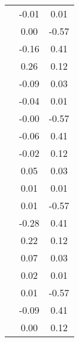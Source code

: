 \begin{table}
\begin{tabular}{c|cc|}
\multicolumn{1}{|c|}{} & \multicolumn{1}{|c|}{     -0.01} & \multicolumn{1}{|c|}{      0.01} \\ 
\multicolumn{1}{|c|}{} & \multicolumn{1}{|c|}{      0.00} & \multicolumn{1}{|c|}{     -0.57} \\ 
\multicolumn{1}{|c|}{} & \multicolumn{1}{|c|}{     -0.16} & \multicolumn{1}{|c|}{      0.41} \\ 
\multicolumn{1}{|c|}{} & \multicolumn{1}{|c|}{      0.26} & \multicolumn{1}{|c|}{      0.12} \\ 
\multicolumn{1}{|c|}{} & \multicolumn{1}{|c|}{     -0.09} & \multicolumn{1}{|c|}{      0.03} \\ 
\multicolumn{1}{|c|}{} & \multicolumn{1}{|c|}{     -0.04} & \multicolumn{1}{|c|}{      0.01} \\ 
\multicolumn{1}{|c|}{} & \multicolumn{1}{|c|}{     -0.00} & \multicolumn{1}{|c|}{     -0.57} \\ 
\multicolumn{1}{|c|}{} & \multicolumn{1}{|c|}{     -0.06} & \multicolumn{1}{|c|}{      0.41} \\ 
\multicolumn{1}{|c|}{} & \multicolumn{1}{|c|}{     -0.02} & \multicolumn{1}{|c|}{      0.12} \\ 
\multicolumn{1}{|c|}{} & \multicolumn{1}{|c|}{      0.05} & \multicolumn{1}{|c|}{      0.03} \\ 
\multicolumn{1}{|c|}{} & \multicolumn{1}{|c|}{      0.01} & \multicolumn{1}{|c|}{      0.01} \\ 
\multicolumn{1}{|c|}{} & \multicolumn{1}{|c|}{      0.01} & \multicolumn{1}{|c|}{     -0.57} \\ 
\multicolumn{1}{|c|}{} & \multicolumn{1}{|c|}{     -0.28} & \multicolumn{1}{|c|}{      0.41} \\ 
\multicolumn{1}{|c|}{} & \multicolumn{1}{|c|}{      0.22} & \multicolumn{1}{|c|}{      0.12} \\ 
\multicolumn{1}{|c|}{} & \multicolumn{1}{|c|}{      0.07} & \multicolumn{1}{|c|}{      0.03} \\ 
\multicolumn{1}{|c|}{} & \multicolumn{1}{|c|}{      0.02} & \multicolumn{1}{|c|}{      0.01} \\ 
\multicolumn{1}{|c|}{} & \multicolumn{1}{|c|}{      0.01} & \multicolumn{1}{|c|}{     -0.57} \\ 
\multicolumn{1}{|c|}{} & \multicolumn{1}{|c|}{     -0.09} & \multicolumn{1}{|c|}{      0.41} \\ 
\multicolumn{1}{|c|}{} & \multicolumn{1}{|c|}{      0.00} & \multicolumn{1}{|c|}{      0.12} \\ 

\end{tabular}
\end{table}
